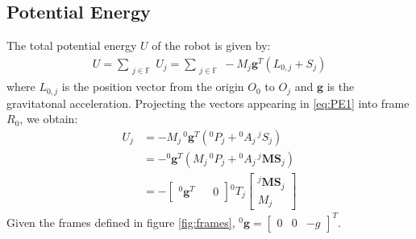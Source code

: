 \documentclass[a4paper,10pt]{article}
\begin{document}
\subsection{Potential Energy}
The total potential energy $U$ of the robot is given by:
\begin{align}
 U = \sum_{\substack{j \in \mathbb{F}}} U_j = \sum_{\substack{j \in \mathbb{F}}} -M_j \mathbf{g}^T(L_{0,j}+S_j) \label{eq:PE1}
\end{align}
where $L_{0,j}$ is the position vector from the origin $O_0$ to $O_j$ and $\mathbf{g}$ is the gravitatonal acceleration. Projecting 
the vectors appearing in \ref{eq:PE1} into frame $R_0$, we obtain:
\begin{align}
 U_j &= -M_j\,{}^0\mathbf{g}^T({}^0P_j+{}^0A_j\,{}^jS_j) \\ &= -{}^0\mathbf{g}^T(M_j\,{}^0P_j+{}^0A_j\,{}^j\mathbf{MS}_j) \\ 
 &= -\left[\begin{matrix} {}^0\mathbf{g}^T && 0 \end{matrix} \right] {}^0T_j\left[ \begin{matrix} {}^j\mathbf{MS}_j \\ M_j \end{matrix} \right]
\end{align}
Given the frames defined in figure \ref{fig:frames}, ${}^0\mathbf{g} = \left[\begin{matrix}0 & 0 & -g \end{matrix}\right]^T$.
\end{document}
